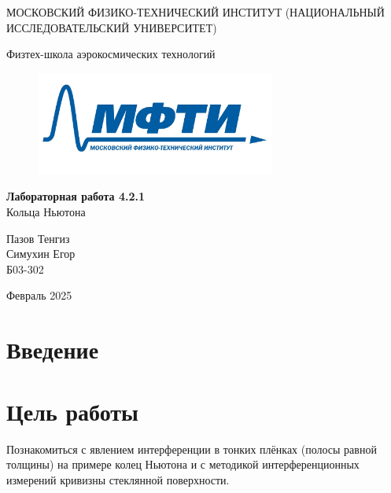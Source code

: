 \documentclass[a4paper,12pt]{article} %
\date{\today}
\begin{document}
\begin{titlepage}
	\begin{center}
		{\large МОСКОВСКИЙ ФИЗИКО-ТЕХНИЧЕСКИЙ ИНСТИТУТ (НАЦИОНАЛЬНЫЙ ИССЛЕДОВАТЕЛЬСКИЙ УНИВЕРСИТЕТ)}
	\end{center}
	\begin{center}
		{\large Физтех-школа аэрокосмических технологий}
	\end{center}
	\begin{figure}[h]
    		\centering
    		\includegraphics[width=0.7\textwidth]{MIPT.jpg}
    		\label{setup}
	\end{figure}
	
	\vspace{3cm}
	{\huge
		\begin{center}
			{\bf Лабораторная работа 4.2.1}\\
			Кольца Ньютона
		\end{center}
	}
	\vspace{1cm}
	\begin{center}
		{\large Пазов Тенгиз \\
                    Симухин Егор \\
			\vspace{0.2cm}
			Б03-302}
	\end{center}
	\vspace{8cm}
	\begin{center}
		Февраль 2025
	\end{center}
\end{titlepage}

\section{Введение}
\section*{Цель работы}
Познакомиться с явлением интерференции в тонких
плёнках (полосы равной толщины) на примере колец Ньютона и с
методикой интерференционных измерений кривизны стеклянной поверхности.
\end{document}
